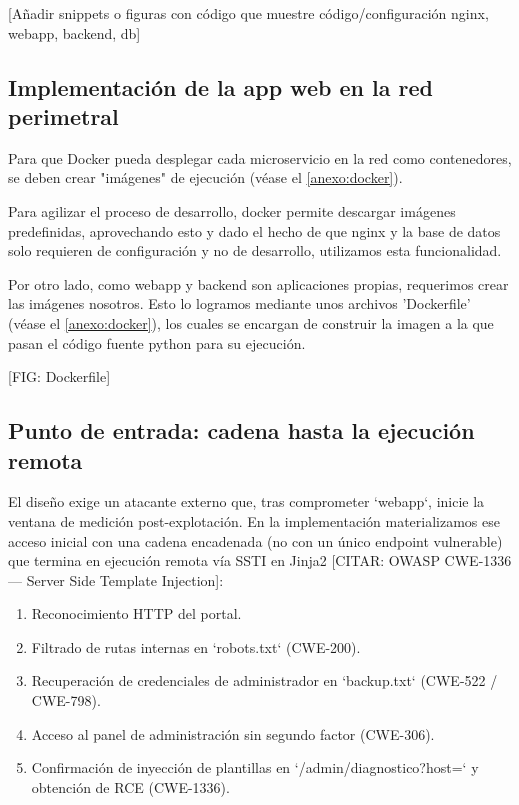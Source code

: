 \documentclass[11pt,spanish,listoffigures,listoftables]{tfgetsinf}
\begin{document}
        [Añadir snippets o figuras con código que muestre código/configuración nginx, webapp, backend, db]
        
        \subsection{Implementación de la app web en la red perimetral}
        Para que Docker pueda desplegar cada microservicio en la red como contenedores, se deben crear "imágenes" de ejecución (véase el \ref{anexo:docker}).

        Para agilizar el proceso de desarrollo, docker permite descargar imágenes predefinidas, aprovechando esto y dado el hecho de que nginx y la base de datos solo requieren de configuración y no de desarrollo, utilizamos esta funcionalidad.

        Por otro lado, como webapp y backend son aplicaciones propias, requerimos crear las imágenes nosotros. Esto lo logramos mediante unos archivos 'Dockerfile' (véase el \ref{anexo:docker}), los cuales se encargan de construir la imagen a la que pasan el código fuente python para su ejecución.

        [FIG: Dockerfile]
        
        \subsection{Punto de entrada: cadena hasta la ejecución remota}
        \label{sec:5.2.2}
        El diseño exige un atacante externo que, tras comprometer `webapp`, inicie la ventana de medición post-explotación. En la implementación materializamos ese acceso inicial con una cadena encadenada (no con un único endpoint vulnerable) que termina en ejecución remota vía SSTI en Jinja2 [CITAR: OWASP CWE-1336 — Server Side Template Injection]:
        \begin{enumerate}
            \item Reconocimiento HTTP del portal.
            \item Filtrado de rutas internas en `robots.txt` (CWE-200).
            \item Recuperación de credenciales de administrador en `backup.txt` (CWE-522 / CWE-798).
            \item Acceso al panel de administración sin segundo factor (CWE-306).
            \item Confirmación de inyección de plantillas en `/admin/diagnostico?host=` y obtención de RCE (CWE-1336).
        \end{enumerate}
        
\end{document}
